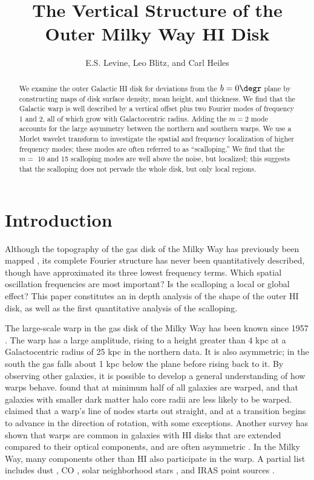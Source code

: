 \documentclass[apj]{emulateapj}
\begin{document}
\title{The Vertical Structure of the Outer Milky Way HI Disk}
\author{E.S. Levine, Leo Blitz, and Carl Heiles
}

\begin{abstract}
We examine the outer Galactic HI disk for deviations from the $b=0\degr$ plane by constructing maps of disk surface density, mean height, and thickness. We find that the Galactic warp is well described by a vertical offset plus two Fourier modes of frequency 1 and 2, all of which grow with Galactocentric radius. Adding the $m=2$ mode  accounts for the large asymmetry between the northern and southern warps. We use a Morlet wavelet transform to investigate the spatial and frequency localization of higher frequency modes; these modes are often referred to as ``scalloping.'' We find that the $m=$ 10 and 15 scalloping modes are well above the noise, but localized; this suggests that the scalloping does not pervade the whole disk, but only local regions.
\end{abstract}


\section{Introduction}
Although the topography of the gas disk of the Milky Way has previously been  mapped \citep[and many others]{W1957, HJK1982,BT1986}, its complete Fourier structure has never been quantitatively described, though \citet{BM1998} have approximated its three lowest frequency terms. 
  Which spatial oscillation frequencies are most important? 
  Is the scalloping a local or global effect? 
  This paper constitutes an in depth analysis of the shape of the outer HI disk, as well as the first quantitative analysis of the scalloping. 
 
  The large-scale warp in the gas disk of the Milky Way has been known since 1957 \citep{B1957,K1957,W1957,KHC1957}.  
The warp has a large amplitude, rising to a height greater than 4 kpc  at a Galactocentric radius of 25 kpc in the northern data. It is also asymmetric; in the south the gas falls about 1 kpc below the plane before rising back to it. By observing other galaxies, it is possible to develop a general understanding of how warps behave. 
 \citet{B1991} found that at minimum half of all galaxies are warped, and that galaxies with smaller dark matter halo core radii are less likely to be warped.
 \citet{B1990} claimed that a warp's line of nodes starts out straight, and at a transition begins to advance in the direction of rotation, with some exceptions.
Another survey has shown that warps are common in galaxies with HI disks that are extended compared to their optical components, and are often asymmetric \citep{GSK2002}. In the Milky Way, many components other than HI also participate in the warp. A partial list includes  dust \citep{FBD1994}, CO \citep{WBB1990}, solar neighborhood stars \citep{D1998}, and IRAS point sources \citep{DS1989}.
\end{document}
